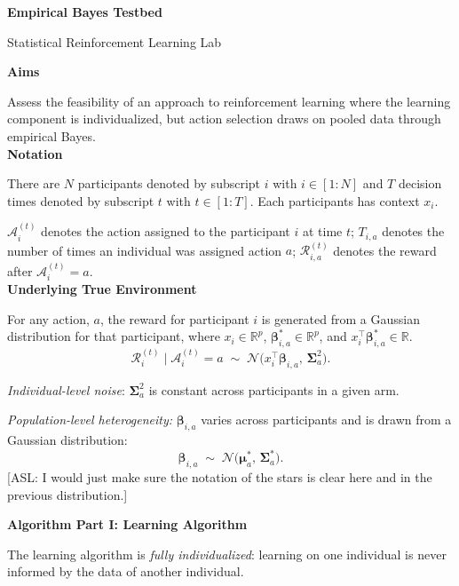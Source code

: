 \documentclass[letterpaper, 11pt]{extarticle}
\newcommand{\asl}[1]{
  {\color{blue} [ASL: {#1}]}
 }
\begin{document}
\begin{Large}
    \textsf{\textbf{Empirical Bayes Testbed}}   \par
    Statistical Reinforcement Learning Lab
\end{Large}

\vspace{2ex}

\textsf{\textbf{Aims}}

Assess the feasibility of an approach to reinforcement learning where the learning component is individualized, but action selection draws on pooled data through empirical Bayes.
\\

\textsf{\textbf{Notation}}

There are $N$ participants denoted by subscript $i$ with $i \in  [1:N]$ and $T$ decision times denoted by subscript $t$ with $t \in [1:T]$. Each participants has context $x_i$. 

$\mathcal{A}_i^{(t)}$ denotes the action assigned to the participant $i$ at time $t$; $T_{i,a}$ denotes the number of times an individual was assigned action $a$; $\mathcal{R}_{i,a}^{(t)}$ denotes the reward after $\mathcal{A}_i^{(t)}=a$.
\\

\textsf{\textbf{Underlying True Environment}} 

For any action, $a$, the reward for participant $i$ is generated from a  Gaussian distribution for that participant, where $x_i \in \mathbb{R}^p$, $\boldsymbol{\beta}_{i,a}^* \in \mathbb{R}^p$, and $x_i^\top \boldsymbol{\beta}_{i,a}^* \in \mathbb{R}$. 
\[
\mathcal{R}_i^{(t)} \;\big|\; \mathcal{A}_i^{(t)} = a 
\;\sim\; \mathcal{N}\!\big(x_i^\top \boldsymbol{\beta}_{i,a}, \, \boldsymbol{\Sigma}_{a}^2\big).
\]

\textit{Individual-level noise}: $\boldsymbol{\Sigma}^2_a$ is constant across participants in a given arm.

\textit{Population-level heterogeneity:} $\boldsymbol{\beta}_{i,a}$ varies across participants and is drawn from a Gaussian distribution:  
\[
\boldsymbol{\beta}_{i,a} \;\sim\; \mathcal{N}\!\big(\boldsymbol{\mu}_a^*, \, {\boldsymbol{\Sigma}_a^*}\big).
\] \asl{I would just make sure the notation of the stars is clear here and in the previous distribution.}

\newpage
\textsf{\textbf{Algorithm Part I: Learning Algorithm}}

The learning algorithm is \textit{fully individualized}: learning on one individual is never informed by the data of another individual. 
\end{document}
